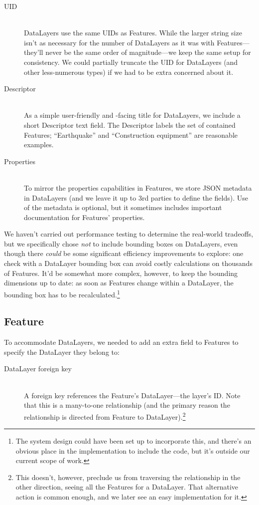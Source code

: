 \begin{description}

\item[UID] \hfill \\
DataLayers use the same UIDs as Features. While the larger string size isn't as necessary for the number of DataLayers as it was with Features---they'll never be the same order of magnitude---we keep the same setup for consistency. We could partially truncate the UID for DataLayers (and other less-numerous types) if we had to be extra concerned about it.

\item[Descriptor] \hfill \\
As a simple user-friendly and -facing title for DataLayers, we include a short Descriptor text field. The Descriptor labels the set of contained Features; ``Earthquake'' and ``Construction equipment'' are reasonable examples.

\item[Properties] \hfill \\
To mirror the properties capabilities in Features, we store JSON metadata in DataLayers (and we leave it up to 3rd parties to define the fields). Use of the metadata is optional, but it sometimes includes important documentation for Features' properties.
  
\end{description}

 We haven't carried out performance testing to determine the real-world tradeoffs, but we specifically chose \textit{not} to include bounding boxes on DataLayers, even though there \textit{could} be some significant efficiency improvements to explore: one check with a DataLayer bounding box can avoid costly calculations on thousands of Features. It'd be somewhat more complex, however, to keep the bounding dimensions up to date: as soon as Features change within a DataLayer, the bounding box has to be recalculated.\footnote{The system design could have been set up to incorporate this, and there's an obvious place in the implementation to include the code, but it's outside our current scope of work.}

\subsection{Feature}
To accommodate DataLayers, we needed to add an extra field to Features to specify the DataLayer they belong to:

\begin{description}

\item[DataLayer foreign key] \hfill \\
A foreign key references the Feature's DataLayer---the layer's ID. Note that this is a many-to-one relationship (and the primary reason the relationship is directed from Feature to DataLayer).\footnote{This doesn't, however, preclude us from traversing the relationship in the other direction, seeing all the Features for a DataLayer. That alternative action is common enough, and we later see an easy implementation for it.}

\end{description}


